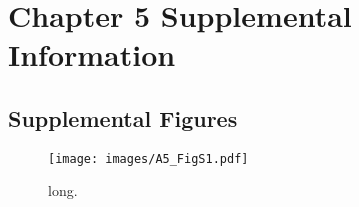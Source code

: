 \chapter{Chapter 5 Supplemental Information}
\label{sec:app5}
\raggedbottom

\clearpage

\section{Supplemental Figures}


\begin{figure}[htbp]
\centering
\texttt{[image: images/A5\_FigS1.pdf]}
\caption[short]{long.}
\label{fig:a5f1}
\end{figure}
